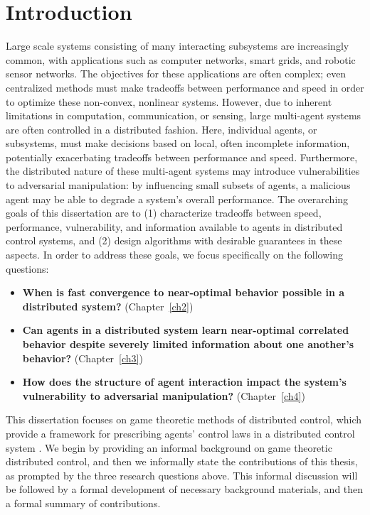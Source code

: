 \chapter{\Large Introduction}
\label{introchap}

Large scale systems consisting of many interacting subsystems are increasingly common, with applications such as computer networks, smart grids, and robotic sensor networks. The objectives for these applications are often complex; even centralized methods must make tradeoffs between performance and speed in order to optimize these non-convex, nonlinear systems. However, due to inherent limitations in computation, communication, or sensing, large multi-agent systems are often controlled in a distributed fashion. Here, individual agents, or subsystems, must make decisions based on local, often incomplete information, potentially exacerbating tradeoffs between performance and speed. Furthermore, the distributed nature of these multi-agent systems may introduce vulnerabilities to adversarial manipulation: by influencing small subsets of agents, a malicious agent may be able to degrade a system's overall performance.
The overarching goals of this dissertation are to (1) characterize tradeoffs between speed, performance, vulnerability, and information available to agents in distributed control systems, and (2) design algorithms with desirable guarantees in these aspects. 
In order to address these goals, we focus specifically on the following questions:


\begin{itemize}[leftmargin=*]
\item \textbf{When is fast convergence to near-optimal behavior possible in a distributed system?} (Chapter~\ref{ch2})
\item\textbf{Can agents in a distributed system learn near-optimal correlated behavior despite severely limited information about one another's behavior?} (Chapter~\ref{ch3})
\item\textbf{How does the structure of agent interaction impact the system's vulnerability to adversarial manipulation?} (Chapter~\ref{ch4})
\end{itemize}

This dissertation focuses on game theoretic methods of distributed control, which provide a framework for prescribing agents' control laws in a distributed control system \cite{Marden2008, Zhu2009, Goto2010, Staudigl2012, Fox2010, Lasaulce2011, Alpcan2010, Han2012, MacKenzie2006, Menache2011}. We begin by providing an informal background on game theoretic distributed control, and then we informally state the contributions of this thesis, as prompted by the three research questions above. This informal discussion will be followed by a formal development of necessary background materials, and then a formal summary of  contributions. 

